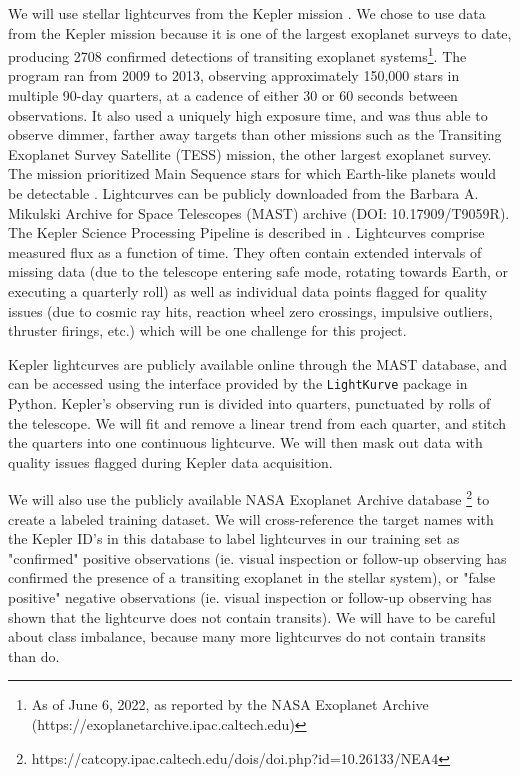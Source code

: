 \documentclass{article}
\begin{document}
We will use stellar lightcurves from the Kepler mission \citep{Ricker2015}. We chose to use data from the Kepler mission because it is one of the largest exoplanet surveys to date,  producing 2708 confirmed detections of transiting exoplanet systems\footnote{As of June 6, 2022, as reported by the NASA Exoplanet Archive (https://exoplanetarchive.ipac.caltech.edu)}. The program ran from 2009 to 2013, observing approximately 150,000 stars in multiple 90-day quarters, at a cadence of either 30 or 60 seconds between observations.  It also used a uniquely high exposure time, and was thus able to observe dimmer, farther away targets than other missions such as the Transiting Exoplanet Survey Satellite (TESS) mission, the other largest exoplanet survey. The mission prioritized Main Sequence stars for which Earth-like planets would be detectable \citep{Batalha_2010}. Lightcurves can be publicly downloaded from the Barbara A. Mikulski Archive for Space Telescopes (MAST) archive (DOI: 10.17909/T9059R). The Kepler Science Processing Pipeline is described in \cite{Jenkins2010}. Lightcurves comprise measured flux as a function of time. They often contain extended intervals of missing data (due to the telescope entering safe mode, rotating towards Earth, or executing a quarterly roll) as well as individual data points flagged for quality issues (due to cosmic ray hits, reaction wheel zero crossings, impulsive outliers, thruster firings, etc.) \citep{Thompson_2016} which will be one challenge for this project. 

Kepler lightcurves are publicly available online through the MAST database, and can be accessed  using the interface provided by the \texttt{LightKurve} package in Python. Kepler's observing run is divided into quarters, punctuated by rolls of the telescope. We will fit and remove a linear trend from each quarter, and stitch the quarters into one continuous lightcurve. We will then mask out data with quality issues flagged during Kepler data acquisition. 

We will also use the publicly available NASA Exoplanet Archive database \footnote{https://catcopy.ipac.caltech.edu/dois/doi.php?id=10.26133/NEA4} to create a labeled training  dataset. We will cross-reference the target names with the Kepler ID's in this database to label lightcurves in our training set as "confirmed" positive observations (ie. visual inspection  or follow-up observing has confirmed the presence of a transiting exoplanet in the stellar system), or "false positive" negative observations (ie. visual inspection  or follow-up observing has shown that the lightcurve does not contain transits). We will have to be careful about class imbalance, because many more lightcurves do not contain transits than do.
\end{document}

